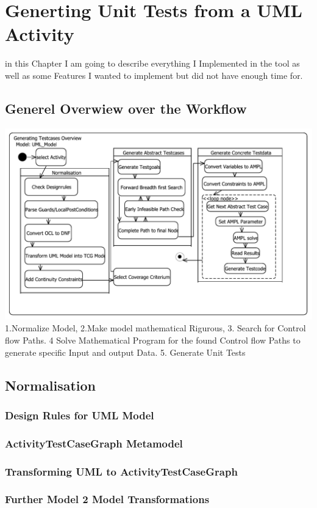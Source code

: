 \chapter{Generting Unit Tests from a UML Activity}
in this Chapter I am going to describe everything I Implemented in the tool as well as some Features I wanted to implement but did not have enough time for.
\section{Generel Overwiew over the Workflow}
\includegraphics[width=\textwidth]{pics/workflow.pdf}
1.Normalize Model, 2.Make model mathematical Rigurous, 3. Search for Control flow Paths. 4 Solve Mathematical Program for the found Control flow Paths to generate specific Input and output Data. 5. Generate Unit Tests
\section{Normalisation}
\subsection{Design Rules for UML Model}
\subsection{ActivityTestCaseGraph Metamodel}
\subsection{Transforming UML to ActivityTestCaseGraph}
\subsection{Further Model 2 Model Transformations}
